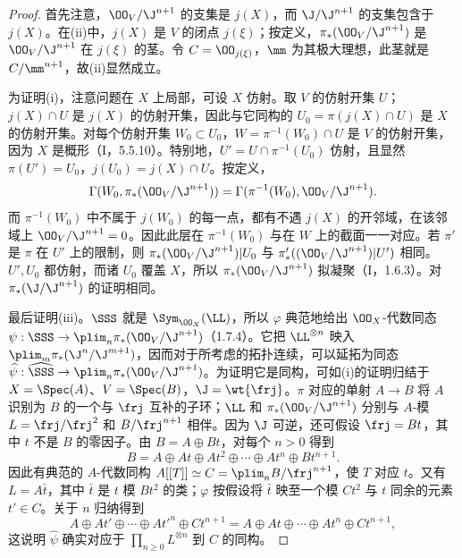 \begin{proof}
首先注意，$\OO_V/\J^{n+1}$ 的支集是 $j(X)$，而 $\J/\J^{n+1}$ 的支集包含于 $j(X)$。在(ii)中，$j(X)$ 是 $V$ 的闭点 $j(\xi)$；按定义，$\pi_*(\OO_V/\J^{n+1})$ 是 $\OO_V/\J^{n+1}$ 在 $j(\xi)$ 的茎。令 $C=\OO_{j(\xi)}$，$\mm$ 为其极大理想，此茎就是 $C/\mm^{n+1}$，故(ii)显然成立。

为证明(i)，注意问题在 $X$ 上局部，可设 $X$ 仿射。取 $V$ 的仿射开集 $U$；$j(X)\cap U$ 是 $j(X)$ 的仿射开集，因此与它同构的 $U_0=\pi(j(X)\cap U)$ 是 $X$ 的仿射开集。对每个仿射开集 $W_0\subset U_0$，$W=\pi^{-1}(W_0)\cap U$ 是 $V$ 的仿射开集，因为 $X$ 是概形（I，5.5.10）。特别地，$U'=U\cap\pi^{-1}(U_0)$ 仿射，且显然 $\pi(U')=U_0$，$j(U_0)=j(X)\cap U$。按定义，
\[\Gamma(W_0,\pi_*(\OO_V/\J^{n+1}))=\Gamma(\pi^{-1}(W_0),\OO_V/\J^{n+1}).\]
而 $\pi^{-1}(W_0)$ 中不属于 $j(W_0)$ 的每一点，都有不遇 $j(X)$ 的开邻域，在该邻域上 $\OO_V/\J^{n+1}=0$。因此此层在 $\pi^{-1}(W_0)$ 与在 $W$ 上的截面一一对应。若 $\pi'$ 是 $\pi$ 在 $U'$ 上的限制，则 $\pi_*(\OO_V/\J^{n+1})|U_0$ 与 $\pi'_*( (\OO_V/\J^{n+1})|U')$ 相同。$U',U_0$ 都仿射，而诸 $U_0$ 覆盖 $X$，所以 $\pi_*(\OO_V/\J^{n+1})$ 拟凝聚（I，1.6.3）。对 $\pi_*(\J/\J^{n+1})$ 的证明相同。

最后证明(iii)。$\SSS$ 就是 $\Sym_{\OO_X}(\LL)$，所以 $\varphi$ 典范地给出 $\OO_X$-代数同态 $\psi:\SSS\to\plim_n\pi_*(\OO_V/\J^{n+1})$（1.7.4）。它把 $\LL^{\otimes n}$ 映入 $\plim_m\pi_*(\J^n/\J^{m+1})$，因而对于所考虑的拓扑连续，可以延拓为同态 $\widehat\psi:\widehat\SSS\to\plim_n\pi_*(\OO_V/\J^{n+1})$。为证明它是同构，可如(i)的证明归结于 $X=\Spec(A)$、$V=\Spec(B)$，$\J=\wt{\frj}$。$\pi$ 对应的单射 $A\to B$ 将 $A$ 识别为 $B$ 的一个与 $\frj$ 互补的子环；$\LL$ 和 $\pi_*(\OO_V/\J^{n+1})$ 分别与 $A$-模 $L=\frj/\frj^2$ 和 $B/\frj^{n+1}$ 相伴。因为 $\J$ 可逆，还可假设 $\frj=Bt$，其中 $t$ 不是 $B$ 的零因子。由 $B=A\oplus Bt$，对每个 $n>0$ 得到
\[B=A\oplus At\oplus At^2\oplus\cdots\oplus At^n\oplus Bt^{n+1}.\]
因此有典范的 $A$-代数同构 $A[[T]]\simeq C=\plim_n B/\frj^{n+1}$，使 $T$ 对应 $t$。又有 $L=A\bar t$，其中 $\bar t$ 是 $t$ 模 $Bt^2$ 的类；$\varphi$ 按假设将 $\bar t$ 映至一个模 $Ct^2$ 与 $t$ 同余的元素 $t'\in C$。关于 $n$ 归纳得到
\[A\oplus At'\oplus\cdots\oplus At'^n\oplus Ct^{n+1}
=A\oplus At\oplus\cdots\oplus At^n\oplus Ct^{n+1},\]
这说明 $\widehat\psi$ 确实对应于 $\prod_{n\geq0}L^{\otimes n}$ 到 $C$ 的同构。
\end{proof}

